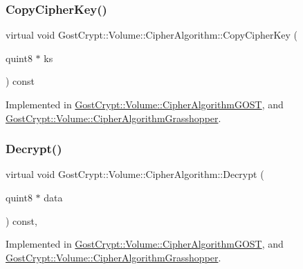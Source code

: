 \subsubsection{\texorpdfstring{Copy\+Cipher\+Key()}{CopyCipherKey()}}
{\footnotesize\ttfamily virtual void Gost\+Crypt\+::\+Volume\+::\+Cipher\+Algorithm\+::\+Copy\+Cipher\+Key (\begin{DoxyParamCaption}\item[{quint8 $\ast$}]{ks }\end{DoxyParamCaption}) const\hspace{0.3cm}{\ttfamily [pure virtual]}}



Implemented in \hyperlink{class_gost_crypt_1_1_volume_1_1_cipher_algorithm_g_o_s_t_aa2182b151f6de4a86be8bcc650af70a9}{Gost\+Crypt\+::\+Volume\+::\+Cipher\+Algorithm\+G\+O\+ST}, and \hyperlink{class_gost_crypt_1_1_volume_1_1_cipher_algorithm_grasshopper_afb28e10054150eec630294cd4eb5850c}{Gost\+Crypt\+::\+Volume\+::\+Cipher\+Algorithm\+Grasshopper}.

\mbox{\label{class_gost_crypt_1_1_volume_1_1_cipher_algorithm_a014d9a3b3db18ec963c0e524b4f0d445}} 
\subsubsection{\texorpdfstring{Decrypt()}{Decrypt()}}
{\footnotesize\ttfamily virtual void Gost\+Crypt\+::\+Volume\+::\+Cipher\+Algorithm\+::\+Decrypt (\begin{DoxyParamCaption}\item[{quint8 $\ast$}]{data }\end{DoxyParamCaption}) const\hspace{0.3cm}{\ttfamily [protected]}, {}}



Implemented in \hyperlink{class_gost_crypt_1_1_volume_1_1_cipher_algorithm_g_o_s_t_a9412774777c6cd1b7d529885d9f1f681}{Gost\+Crypt\+::\+Volume\+::\+Cipher\+Algorithm\+G\+O\+ST}, and \hyperlink{class_gost_crypt_1_1_volume_1_1_cipher_algorithm_grasshopper_aac197107282f4d3382961adb7130548e}{Gost\+Crypt\+::\+Volume\+::\+Cipher\+Algorithm\+Grasshopper}.


